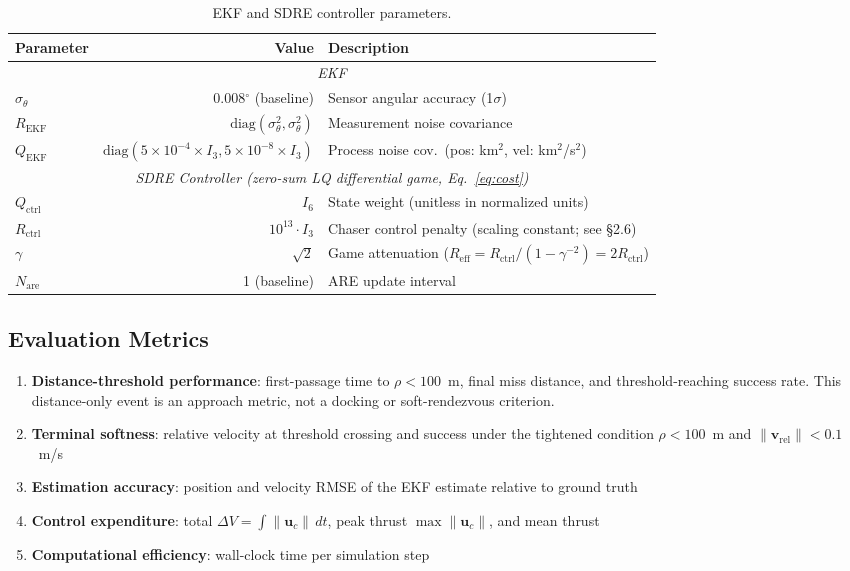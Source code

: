 \documentclass[preprint,3p,times]{elsarticle}
\begin{document}
\begin{table}[h]
\centering
\caption{EKF and SDRE controller parameters.}
\label{tab:ekf_ctrl}
\begin{tabular}{lrl}
\toprule
Parameter & Value & Description \\
\midrule
\multicolumn{3}{c}{\textit{EKF}} \\
$\sigma_\theta$ & 0.008$^\circ$ (baseline) & Sensor angular accuracy (1$\sigma$) \\
$R_{\text{EKF}}$ & $\text{diag}(\sigma_\theta^2, \sigma_\theta^2)$ & Measurement noise covariance \\
$Q_{\text{EKF}}$ & $\text{diag}(5\times10^{-4}\times I_3, 5\times10^{-8}\times I_3)$ & Process noise cov.\ (pos: km$^2$, vel: km$^2$/s$^2$) \\
\multicolumn{3}{c}{\textit{SDRE Controller (zero-sum LQ differential game, Eq.~\ref{eq:cost})}} \\
$Q_{\text{ctrl}}$ & $I_6$ & State weight (unitless in normalized units) \\
$R_{\text{ctrl}}$ & $10^{13} \cdot I_3$ & Chaser control penalty (scaling constant; see §2.6) \\
$\gamma$ & $\sqrt{2}$ & Game attenuation ($R_{\text{eff}} = R_{\text{ctrl}}/(1-\gamma^{-2}) = 2 R_{\text{ctrl}}$) \\
$N_{\text{are}}$ & 1 (baseline) & ARE update interval \\
\bottomrule
\end{tabular}
\end{table}

\subsection{Evaluation Metrics}

\begin{enumerate}
    \item \textbf{Distance-threshold performance}: first-passage time to $\rho < 100$~m, final miss distance, and threshold-reaching success rate. This distance-only event is an approach metric, not a docking or soft-rendezvous criterion.
    \item \textbf{Terminal softness}: relative velocity at threshold crossing and success under the tightened condition $\rho < 100$~m and $\|\mathbf{v}_{\text{rel}}\| < 0.1$~m/s
    \item \textbf{Estimation accuracy}: position and velocity RMSE of the EKF estimate relative to ground truth
    \item \textbf{Control expenditure}: total $\Delta V = \int \|\mathbf{u}_c\|\, dt$, peak thrust $\max \|\mathbf{u}_c\|$, and mean thrust
    \item \textbf{Computational efficiency}: wall-clock time per simulation step
\end{enumerate}
\end{document}
